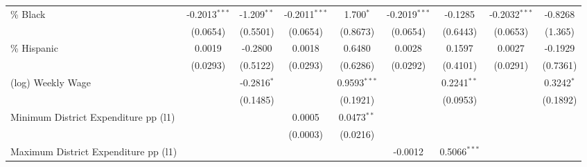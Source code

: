 \documentclass[
  10pt,
]{article}
\begin{document}
\begin{table}[htbp]
\begin{adjustbox}{max width=\linewidth}
\begin{tabular}{lcccccccc}
         \% Black                                       & -0.2013$^{***}$     & -1.209$^{**}$           & -0.2011$^{***}$     & 1.700$^{*}$                     & -0.2019$^{***}$     & -0.1285                         & -0.2032$^{***}$     & -0.8268\\   
                                                        & (0.0654)            & (0.5501)                & (0.0654)            & (0.8673)                        & (0.0654)            & (0.6443)                        & (0.0653)            & (1.365)\\   
         \% Hispanic                                    & 0.0019              & -0.2800                 & 0.0018              & 0.6480                          & 0.0028              & 0.1597                          & 0.0027              & -0.1929\\   
                                                        & (0.0293)            & (0.5122)                & (0.0293)            & (0.6286)                        & (0.0292)            & (0.4101)                        & (0.0291)            & (0.7361)\\   
         (log) Weekly Wage                              &                     & -0.2816$^{*}$           &                     & 0.9593$^{***}$                  &                     & 0.2241$^{**}$                   &                     & 0.3242$^{*}$\\   
                                                        &                     & (0.1485)                &                     & (0.1921)                        &                     & (0.0953)                        &                     & (0.1892)\\   
         Minimum District Expenditure pp (l1)           &                     &                         & 0.0005              & 0.0473$^{**}$                   &                     &                                 &                     &   \\   
                                                        &                     &                         & (0.0003)            & (0.0216)                        &                     &                                 &                     &   \\   
         Maximum District Expenditure pp (l1)           &                     &                         &                     &                                 & -0.0012             & 0.5066$^{***}$                  &                     &   \\   

\end{tabular}
\end{adjustbox}
\end{table}
\end{document}
